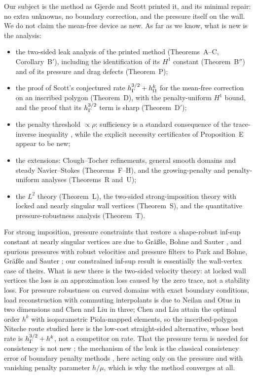 Our subject is the method as Gjerde and Scott printed it, and its minimal repair: no extra unknowns, no boundary correction, and the pressure itself on the wall. We do not claim the mean-free device as new. As far as we know, what is new is the analysis:
\begin{itemize}
\item the two-sided leak analysis of the printed method (Theorems~A--C, Corollary~B$'$), including the identification of its $H^1$ constant (Theorem~B$''$) and of its pressure and drag defects (Theorem~P);
\item the proof of Scott's conjectured rate $h_\Gamma^{3/2}+h_\Omega^k$ for the mean-free correction on an inscribed polygon (Theorem~D), with the penalty-uniform $H^1$ bound, and the proof that its $h_\Gamma^{3/2}$ term is sharp (Theorem~D$'$);
\item the penalty threshold $\propto\rho$: sufficiency is a standard consequence of the trace-inverse inequality \cite{Stenberg1995,JuntunenStenberg2009}, while the explicit necessity certificates of Proposition~E appear to be new;
\item the extensions: Clough--Tocher refinements, general smooth domains and steady Navier--Stokes (Theorems~F--H), and the growing-penalty and penalty-uniform analyses (Theorems~R and~U);
\item the $L^2$ theory (Theorem~L), the two-sided strong-imposition theory with locked and nearly singular wall vertices (Theorem~S), and the quantitative pressure-robustness analysis (Theorem~T).
\end{itemize}
For strong imposition, pressure constraints that restore a shape-robust inf-sup constant at nearly singular vertices are due to Gr\"a\ss le, Bohne and Sauter \cite{GrassleBohneSauter2024}, and spurious pressures with robust velocities and pressure filters to Park \cite{Park2020} and Bohne, Gr\"a\ss le and Sauter \cite{BohneGrassleSauter2025}; our constrained inf-sup result is essentially the wall-vertex case of theirs. What is new there is the two-sided velocity theory: at locked wall vertices the loss is an approximation loss caused by the zero trace, not a stability loss. For pressure robustness on curved domains with exact boundary conditions, load reconstruction with commuting interpolants is due to Neilan and Otus \cite[Theorem~6.1]{NeilanOtus2021} in two dimensions and Chen and Liu \cite{ChenLiu2026} in three; Chen and Liu attain the optimal order $h^k$ with isoparametric Piola-mapped elements, so the inscribed-polygon Nitsche route studied here is the low-cost straight-sided alternative, whose best rate is $h_\Gamma^{3/2}+h^k$, not a competitor on rate.
That the pressure term is needed for consistency is not new \cite{BurmanHansboLarson2019Stokes}; the mechanism of the leak is the classical consistency error of boundary penalty methods \cite{Babuska1973}, here acting only on the pressure and with vanishing penalty parameter $h/\mu$, which is why the method converges at all.

